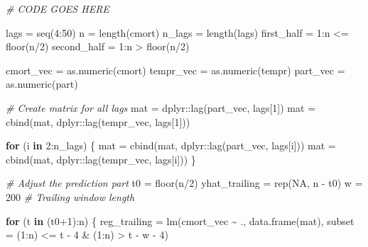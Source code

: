 \documentclass[
]{article}
\newenvironment{Shaded}{\begin{snugshade}}{\end{snugshade}}
\newcommand{\AttributeTok}[1]{\textcolor[rgb]{0.77,0.63,0.00}{#1}}
\newcommand{\CommentTok}[1]{\textcolor[rgb]{0.56,0.35,0.01}{\textit{#1}}}
\newcommand{\ConstantTok}[1]{\textcolor[rgb]{0.00,0.00,0.00}{#1}}
\newcommand{\ControlFlowTok}[1]{\textcolor[rgb]{0.13,0.29,0.53}{\textbf{#1}}}
\newcommand{\DecValTok}[1]{\textcolor[rgb]{0.00,0.00,0.81}{#1}}
\newcommand{\FunctionTok}[1]{\textcolor[rgb]{0.00,0.00,0.00}{#1}}
\newcommand{\NormalTok}[1]{#1}
\newcommand{\OtherTok}[1]{\textcolor[rgb]{0.56,0.35,0.01}{#1}}
\newcommand{\SpecialCharTok}[1]{\textcolor[rgb]{0.00,0.00,0.00}{#1}}
\begin{document}
\begin{Shaded}
\begin{Highlighting}[]
\CommentTok{\# CODE GOES HERE}

\NormalTok{lags }\OtherTok{=} \FunctionTok{seq}\NormalTok{(}\DecValTok{4}\SpecialCharTok{:}\DecValTok{50}\NormalTok{)}
\NormalTok{n }\OtherTok{=} \FunctionTok{length}\NormalTok{(cmort)}
\NormalTok{n\_lags }\OtherTok{=} \FunctionTok{length}\NormalTok{(lags)}
\NormalTok{first\_half }\OtherTok{=} \DecValTok{1}\SpecialCharTok{:}\NormalTok{n }\SpecialCharTok{\textless{}=} \FunctionTok{floor}\NormalTok{(n}\SpecialCharTok{/}\DecValTok{2}\NormalTok{)}
\NormalTok{second\_half }\OtherTok{=} \DecValTok{1}\SpecialCharTok{:}\NormalTok{n }\SpecialCharTok{\textgreater{}} \FunctionTok{floor}\NormalTok{(n}\SpecialCharTok{/}\DecValTok{2}\NormalTok{)}

\NormalTok{cmort\_vec }\OtherTok{=} \FunctionTok{as.numeric}\NormalTok{(cmort)}
\NormalTok{tempr\_vec }\OtherTok{=} \FunctionTok{as.numeric}\NormalTok{(tempr)}
\NormalTok{part\_vec }\OtherTok{=} \FunctionTok{as.numeric}\NormalTok{(part)}

\CommentTok{\# Create matrix for all lags}
\NormalTok{mat }\OtherTok{=}\NormalTok{ dplyr}\SpecialCharTok{::}\FunctionTok{lag}\NormalTok{(part\_vec, lags[}\DecValTok{1}\NormalTok{])}
\NormalTok{mat }\OtherTok{=} \FunctionTok{cbind}\NormalTok{(mat, dplyr}\SpecialCharTok{::}\FunctionTok{lag}\NormalTok{(tempr\_vec, lags[}\DecValTok{1}\NormalTok{]))}

\ControlFlowTok{for}\NormalTok{ (i }\ControlFlowTok{in} \DecValTok{2}\SpecialCharTok{:}\NormalTok{n\_lags) \{}
\NormalTok{  mat }\OtherTok{=} \FunctionTok{cbind}\NormalTok{(mat, dplyr}\SpecialCharTok{::}\FunctionTok{lag}\NormalTok{(part\_vec, lags[i]))}
\NormalTok{  mat }\OtherTok{=} \FunctionTok{cbind}\NormalTok{(mat, dplyr}\SpecialCharTok{::}\FunctionTok{lag}\NormalTok{(tempr\_vec, lags[i]))}
\NormalTok{\}}

\CommentTok{\# Adjust the prediction part}
\NormalTok{t0 }\OtherTok{=} \FunctionTok{floor}\NormalTok{(n}\SpecialCharTok{/}\DecValTok{2}\NormalTok{)}
\NormalTok{yhat\_trailing }\OtherTok{=} \FunctionTok{rep}\NormalTok{(}\ConstantTok{NA}\NormalTok{, n }\SpecialCharTok{{-}}\NormalTok{ t0)}
\NormalTok{w }\OtherTok{=} \DecValTok{200} \CommentTok{\# Trailing window length}

\ControlFlowTok{for}\NormalTok{ (t }\ControlFlowTok{in}\NormalTok{ (t0}\SpecialCharTok{+}\DecValTok{1}\NormalTok{)}\SpecialCharTok{:}\NormalTok{n) \{}
\NormalTok{  reg\_trailing }\OtherTok{=} \FunctionTok{lm}\NormalTok{(cmort\_vec }\SpecialCharTok{\textasciitilde{}}\NormalTok{ .,}
                    \FunctionTok{data.frame}\NormalTok{(mat),}
                    \AttributeTok{subset =}\NormalTok{ (}\DecValTok{1}\SpecialCharTok{:}\NormalTok{n) }\SpecialCharTok{\textless{}=}\NormalTok{ t }\SpecialCharTok{{-}} \DecValTok{4} \SpecialCharTok{\&}\NormalTok{ (}\DecValTok{1}\SpecialCharTok{:}\NormalTok{n) }\SpecialCharTok{\textgreater{}}\NormalTok{ t }\SpecialCharTok{{-}}\NormalTok{ w }\SpecialCharTok{{-}} \DecValTok{4}\NormalTok{)}
  

\end{Highlighting}
\end{Shaded}
\end{document}
